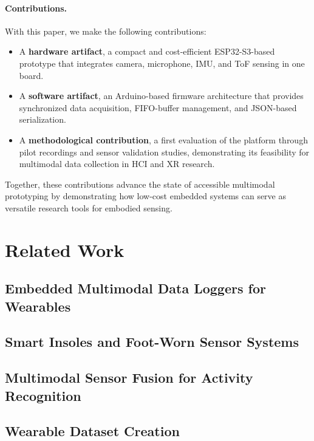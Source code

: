 \documentclass[manuscript,review,anonymous]{acmart}
\begin{document}
\paragraph*{Contributions.}
With this paper, we make the following contributions:
\begin{itemize}
  \item A \textbf{hardware artifact}, a compact and cost-efficient ESP32-S3-based prototype that integrates camera, microphone, IMU, and ToF sensing in one board.
  \item A \textbf{software artifact}, an Arduino-based firmware architecture that provides synchronized data acquisition, FIFO-buffer management, and JSON-based serialization.
  \item A \textbf{methodological contribution}, a first evaluation of the platform through pilot recordings and sensor validation studies, demonstrating its feasibility for multimodal data collection in HCI and XR research.
\end{itemize}

Together, these contributions advance the state of accessible multimodal prototyping by demonstrating how low-cost embedded systems can serve as versatile research tools for embodied sensing.



\section{Related Work}

\subsection{Embedded Multimodal Data Loggers for Wearables}

\subsection{Smart Insoles and Foot-Worn Sensor Systems}

\subsection{Multimodal Sensor Fusion for Activity Recognition}

\subsection{Wearable Dataset Creation}
\end{document}
